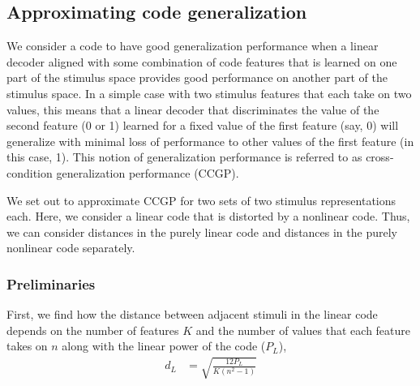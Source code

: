 \documentclass[letter,12pt]{article}
\begin{document}
\subsection{Approximating code generalization}
We consider a code to have good generalization performance when a linear decoder
aligned with some combination of code features that is learned on one part of the
stimulus space provides good performance on another part of the stimulus space.
In a simple case with two stimulus features that each take on two values, this
means that a linear decoder that discriminates the value of the second feature
(0 or 1) learned for a fixed value of the first feature (say, 0) will generalize
with minimal loss of performance to other values of the first feature (in this
case, 1). This notion of generalization performance is referred to as
cross-condition generalization performance (CCGP).

We set out to approximate CCGP for two sets of two stimulus representations
each. Here, we consider a linear code that is distorted by a nonlinear code.
Thus, we can consider distances in the purely linear code and distances in the
purely nonlinear code separately.

\subsubsection{Preliminaries}
First, we find how the distance between
adjacent stimuli in the linear code depends on the number of features $K$ and
the number of values that each feature takes on $n$ along with the linear power
of the code ($P_{L}$),
\begin{align}
d_{L} &= \sqrt{\frac{12 P_{L}}{K (n^2 - 1)}}
\end{align}
\end{document}

